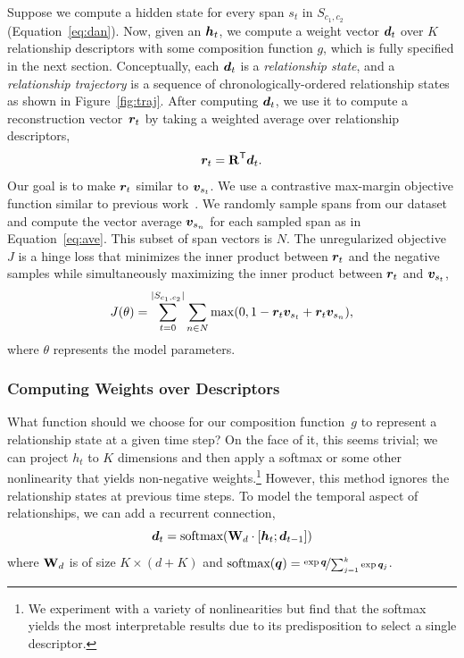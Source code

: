 Suppose we compute a hidden state for every span $s_t$ in $S_{c_1,c_2}$
(Equation~\ref{eq:dan}). Now, given an $\boldsymbol{h}_t$, we compute a weight vector
$\boldsymbol{d}_t$ over $K$ relationship descriptors with some composition function
$g$, which is fully specified in the next section. Conceptually, each
$\boldsymbol{d}_t$ is a \emph{relationship state}, and a \emph{relationship
  trajectory} is a sequence of chronologically-ordered relationship states as
shown in Figure~\ref{fig:traj}. After computing $\boldsymbol{d}_t$, we use it to
compute a reconstruction vector~$\boldsymbol{r}_t$ by taking a weighted average over
relationship descriptors,
\begin{equation}\label{eq:recon}
	\boldsymbol{r}_t = \text{\textbf{R}}^\mathsf{T} \boldsymbol{d}_t.
\end{equation}
Our goal is to make $\boldsymbol{r}_t$ similar to $\boldsymbol{v}_{s_t}$. We use a
contrastive max-margin objective function similar to previous
work~\cite{weston2011wsabie,sochergrounded}. We randomly sample spans from our
dataset and compute the vector average $\boldsymbol{v}_{s_n}$ for each sampled span as
in Equation~\ref{eq:ave}. This subset of span vectors is $N$. The unregularized
objective~$J$ is a hinge loss that minimizes the inner product between
$\boldsymbol{r}_t$ and the negative samples while simultaneously maximizing the inner
product between $\boldsymbol{r}_t$ and $\boldsymbol{v}_{s_t}$,
\begin{equation}\label{eqn:obj}
J(\theta) = \sum\limits_{t=0}^{| S_{c_1,c_2} |}\sum\limits_{n \in
  N} \mathrm{max}(0, 1 - \boldsymbol{r}_t\boldsymbol{v}_{s_t} +
\boldsymbol{r}_t\boldsymbol{v}_{s_n}),
\end{equation}
where $\theta$ represents the model parameters.

\subsubsection{Computing Weights over Descriptors}

What function should we choose for our composition function~$g$ to represent a
relationship state at a given time step?  On the face of it, this seems trivial;
we can project $h_t$ to $K$ dimensions and then apply a softmax or some other
nonlinearity that yields non-negative weights.\footnote{We experiment with a
  variety of nonlinearities but find that the softmax yields the most
  interpretable results due to its predisposition to select a single
  descriptor.} However, this method ignores the relationship states at previous
time steps. To model the temporal aspect of relationships, we can add a
recurrent connection,
\begin{equation}\label{eq:rnn}
	\boldsymbol{d}_t = \mbox{softmax}(\text{\textbf{W}}_d\cdot [\boldsymbol{h}_t;\boldsymbol{d}_{t-1}])
\end{equation}
where $\text{\textbf{W}}_d$ is of size $K\times (d+K)$ and
$\mbox{softmax}(\boldsymbol{q}) = \nicefrac{\exp{\boldsymbol{q}}}{\sum_{j=1}^k
  \exp{\boldsymbol{q}_j}}$.


